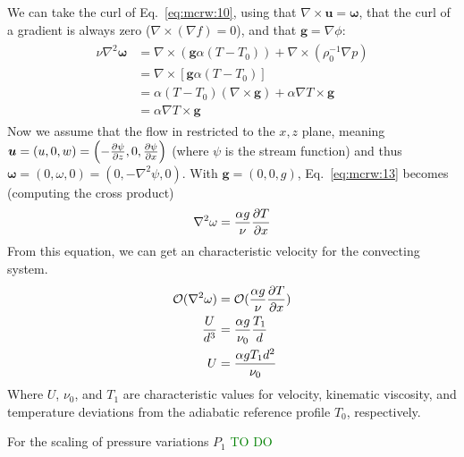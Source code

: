\documentclass[document.tex]{subfiles}
\begin{document}
\begin{mdframed}
    We can take the curl of Eq.~\eqref{eq:mcrw:10}, using that $\nabla \times \bm{u} = \bm{\omega}$, that the curl of a gradient is always zero ($\nabla \times (\nabla f) =0$), and that $\bm{g} = \nabla \phi$: 
    \begin{align} \label{eq:mcrw:13}
        \begin{split}
            \nu \nabla^2\bm{\omega} &= \nabla \times (\bm{g}\alpha(T-T_0))+\nabla \times (\rho_0^{-1}\nabla p) \\
        &= \nabla \times [\bm{g}\alpha(T-T_0)] \\
        &= \alpha(T-T_0)(\nabla \times \bm{g})+ \alpha \nabla T \times \bm{g} \\
        & = \alpha \nabla T \times \bm{g}
        \end{split}
    \end{align}
Now we assume that the flow in restricted to the $x,z$ plane, meaning 
$\bm{u} = (u,0,w) = \left(-\pdv{\psi}{z}, 0, \pdv{\psi}{x}\right)$ (where $\psi$ is the stream function) 
and thus $\bm{\omega} = (0,\omega, 0) = (0, -\nabla^2\psi, 0)$. With $\bm{g} = (0,0,g)$, Eq.~\ref{eq:mcrw:13} becomes (computing the cross product)
\begin{align} \label{eq:mcrw:16}
    \nabla^2\omega = \frac{\alpha g}{\nu}\pdv{T}{x}
\end{align}
From this equation, we can get an characteristic velocity for the convecting system. 
\begin{align*}
    \mathcal{O}(\nabla^2\omega) &=\mathcal{O}(\frac{\alpha g}{\nu} \pdv{T}{x}) \\
    \frac{U}{d^3} &= \frac{\alpha g}{\nu_0} \frac{T_1}{d} \\
    U &= \frac{\alpha g T_1 d^2}{\nu_0}
\end{align*}
Where $U$, $\nu_0$, and $T_1$ are characteristic values for velocity, kinematic viscosity, and temperature deviations from the adiabatic reference profile $T_0$, respectively. 
\end{mdframed}

For the scaling of pressure variations $P_1$ \textcolor{green}{TO DO}
\end{document}
